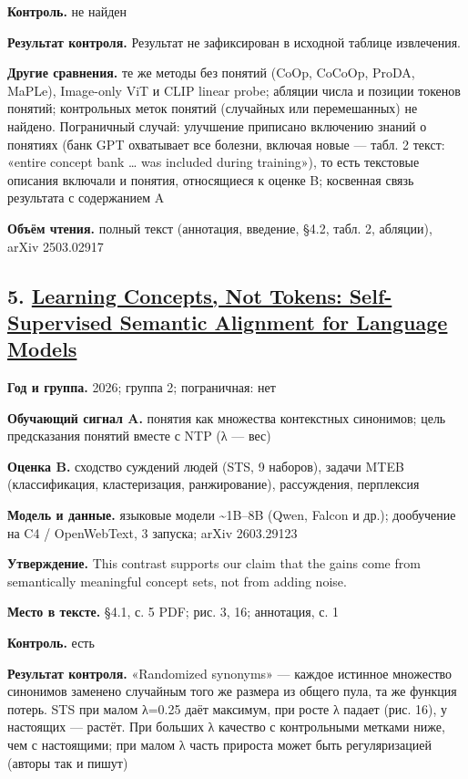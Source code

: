 \textbf{Контроль.} не найден

\textbf{Результат контроля.} Результат не зафиксирован в исходной таблице извлечения.

\textbf{Другие сравнения.} те же методы без понятий (CoOp, CoCoOp, ProDA, MaPLe), Image-only ViT и CLIP linear probe; абляции числа и позиции токенов понятий; контрольных меток понятий (случайных или перемешанных) не найдено. Пограничный случай: улучшение приписано включению знаний о понятиях (банк GPT охватывает все болезни, включая новые — табл. 2 текст: «entire concept bank … was included during training»), то есть текстовые описания включали и понятия, относящиеся к оценке B; косвенная связь результата с содержанием A

\textbf{Объём чтения.} полный текст (аннотация, введение, §4.2, табл. 2, абляции), arXiv 2503.02917


\subsection*{5. \href{https://doi.org/10.18653/2026.emnlp-main.1709}{Learning Concepts, Not Tokens: Self-Supervised Semantic Alignment for Language Models}}

\textbf{Год и группа.} 2026; группа 2; пограничная: нет

\textbf{Обучающий сигнал A.} понятия как множества контекстных синонимов; цель предсказания понятий вместе с NTP (λ — вес)

\textbf{Оценка B.} сходство суждений людей (STS, 9 наборов), задачи MTEB (классификация, кластеризация, ранжирование), рассуждения, перплексия

\textbf{Модель и данные.} языковые модели \textasciitilde{}1B–8B (Qwen, Falcon и др.); дообучение на C4 / OpenWebText, 3 запуска; arXiv 2603.29123

\textbf{Утверждение.} This contrast supports our claim that the gains come from semantically meaningful concept sets, not from adding noise.

\textbf{Место в тексте.} §4.1, с. 5 PDF; рис. 3, 16; аннотация, с. 1

\textbf{Контроль.} есть

\textbf{Результат контроля.} «Randomized synonyms» — каждое истинное множество синонимов заменено случайным того же размера из общего пула, та же функция потерь. STS при малом λ=0.25 даёт максимум, при росте λ падает (рис. 16), у настоящих — растёт. При больших λ качество с контрольными метками ниже, чем с настоящими; при малом λ часть прироста может быть регуляризацией (авторы так и пишут)


